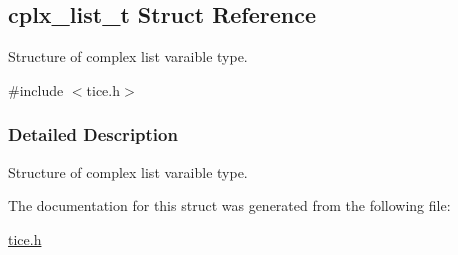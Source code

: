 \hypertarget{structcplx__list__t}{}\subsection{cplx\+\_\+list\+\_\+t Struct Reference}
\label{structcplx__list__t}


Structure of complex list varaible type.  




{\ttfamily \#include $<$tice.\+h$>$}



\subsubsection{Detailed Description}
Structure of complex list varaible type. 

The documentation for this struct was generated from the following file\+:\begin{DoxyCompactItemize}
\item 
\hyperlink{tice_8h}{tice.\+h}\end{DoxyCompactItemize}

